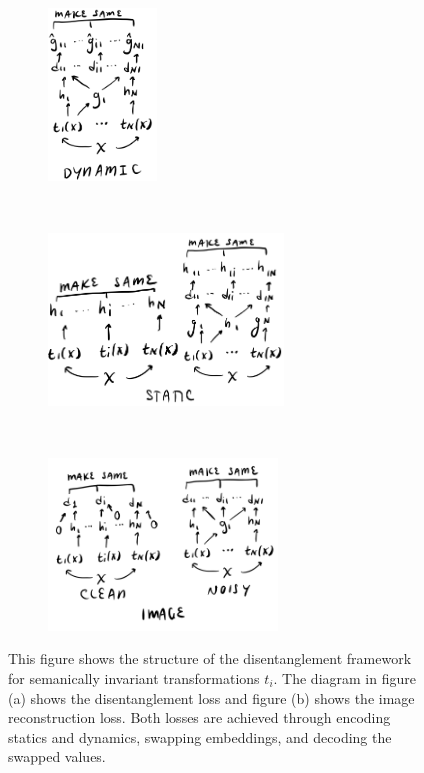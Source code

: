 \documentclass[11pt]{article}
\begin{document}
\begin{figure}[h]
  \begin{subfigure}[b]{0.195\textwidth}
    \centering
    \includegraphics[height=1.8in]{figs/disentangle_loss_dynamic}
    \caption{}
  \end{subfigure}
  ~
  \begin{subfigure}[b]{0.395\textwidth}
    \centering
    \includegraphics[height=1.8in]{figs/disentangle_loss_static}
    \caption{}
  \end{subfigure}%
  ~
  \begin{subfigure}[b]{0.395\textwidth}
    \centering
    \includegraphics[height=1.8in]{figs/imgrec_loss}
    \caption{}
  \end{subfigure}%
  \caption{This figure shows the structure of the disentanglement framework for semanically invariant transformations $t_i$. The diagram in figure (a) shows the disentanglement loss and figure (b) shows the image reconstruction loss. Both losses are achieved through encoding statics and dynamics, swapping embeddings, and decoding the swapped values.}
  \label{fig:disent_losses_invariant}
\end{figure}
\end{document}
